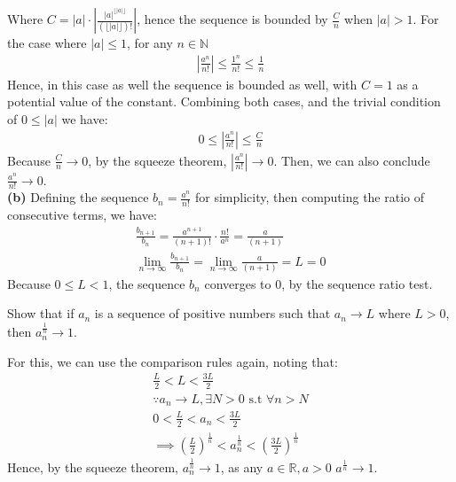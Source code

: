 \documentclass[12pt]{book}
\theoremstyle{definition}
\begin{document}
\begin{sol}
Where $C = |a| \cdot  \left| \frac{|a|^{\lfloor |a| \rfloor}}{(\lfloor |a| \rfloor)!}\right|$, hence the sequence is bounded by $\frac{C}{n}$ when $|a|>1$. For the case where $|a|\leq 1$, for any $n \in \mathbb{N}$
\begin{align*}
	\left|\frac{a^n}{n!}\right| \leq \frac{1^n}{n!}  \leq \frac{1}{n}
\end{align*}
Hence, in this case as well the sequence is bounded as well, with $C=1$ as a potential value of the constant.
Combining both cases, and the trivial condition of $0\leq |a|$ we have:
\begin{align*}
	0 \leq \left|\frac{a^n}{n!}\right| \leq \frac{C}{n}
\end{align*}    
Because $\frac{C}{n} \to 0$, by the squeeze theorem,  $\left|\frac{a^n}{n!}\right| \to 0$. Then, we can also conclude $\frac{a^n}{n!} \to 0$.\\
\textbf{(b)} Defining the sequence $b_n = \frac{a^n}{n!}$ for simplicity, then 
computing the ratio of consecutive terms, we have:
\begin{align*}
\frac{b_{n+1}}{b_n} = \frac{a^{n+1}}{(n+1)!}\cdot \frac{n!}{a^n}= \frac{a}{(n+1)}\\
\lim_{n\to \infty} \frac{b_{n+1}}{b_n} = \lim_{n\to \infty} \frac{a}{(n+1)} = L =0
\end{align*}
Because $0\leq L <1$, the sequence $b_n$ converges to $0$, by the sequence ratio test. 

\end{sol}

\begin{ex}{2.18}
	Show that if $a_n$ is a sequence of positive numbers such that $a_n \to L$ where $L >0$, then $a_n^{\frac{1}{n}} \to 1$.
\end{ex}
\begin{sol}
For this, we can use the comparison rules again, noting that:
\begin{align*}
\frac{L}{2}<L < \frac{3L}{2}	\\
\because a_n \to L, \exists N >0 \text{ s.t } \forall n > N\\
0<\frac{L}{2}<a_n < \frac{3L}{2} \\
\implies \left(\frac{L}{2} \right)^\frac{1}{n} < a_n^{\frac{1}{n}} < \left(\frac{3L}{2} \right)^\frac{1}{n}
\end{align*}
Hence, by the squeeze theorem, $a_n^{\frac{1}{n}} \to 1$, as any $a \in \mathbb{R}, a>0$ $a^{\frac{1}{n}} \to 1$.

\end{sol}
\end{document}
